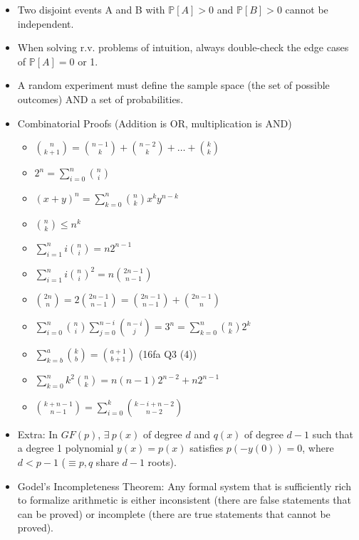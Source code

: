 \documentclass{article}
\begin{document}
\begin{itemize}
	\item Two disjoint events A and B with $\mathbb{P}[A] > 0$ and $\mathbb{P}[B] > 0$ cannot be independent.
	\item When solving r.v. problems of intuition, always double-check the edge cases of $\mathbb{P}[A] = 0$ or 1.
	\item A random experiment must define the sample space (the set of possible outcomes) AND a set of probabilities.
	\item Combinatorial Proofs (Addition is OR, multiplication is AND)
	\begin{itemize}
		\item $\binom{n}{k+1} = \binom{n-1}{k} + \binom{n-2}{k} + \dots + \binom{k}{k}$
		\item $2^n = \sum\limits_{i=0}^n \binom{n}{i}$
		\item $(x+y)^n = \sum\limits_{k=0}^n \binom{n}{k}x^ky^{n-k}$
		\item $\binom{n}{k}\leq n^k$
		\item $\sum\limits_{i=1}^n i\binom{n}{i} = n2^{n-1}$
		\item $\sum\limits_{i=1}^n i\binom{n}{i}^2 = n\binom{2n-1}{n-1}$
		\item $\binom{2n}{n} = 2\binom{2n-1}{n-1} = \binom{2n-1}{n-1}+\binom{2n-1}{n}$
		\item $\sum\limits_{i=0}^n \binom{n}{i} \sum\limits_{j=0}^{n-i} \binom{n-i}{j} = 3^n = \sum\limits_{k=0}^{n}\binom{n}{k}2^k$
		\item $\sum_{k=b}^{a} \binom{k}{b} = \binom{a+1}{b+1}$ (16fa Q3 (4))
		\item $\sum\limits_{k=0}^n k^2\binom{n}{k} = n(n-1)2^{n-2}+n2^{n-1}$
		\item $\binom{k+n-1}{n-1} = \sum\limits_{i=0}^{k} \binom{k-i+n-2}{n-2}$
	\end{itemize}
	\item Extra: In $GF(p)$, $\exists\ p(x)$ of degree $d$ and $q(x)$ of degree $d-1$ such that a degree 1 polynomial $y(x) = p(x)$ satisfies $p(-y(0)) = 0$, where $d < p-1$ ($\equiv p,q$ share $d-1$ roots).
	\item Godel’s Incompleteness Theorem: Any formal system that is sufficiently rich to formalize arithmetic is either inconsistent (there are false statements that can be proved) or incomplete (there are true statements that cannot be proved).
\end{itemize}
\end{document}
